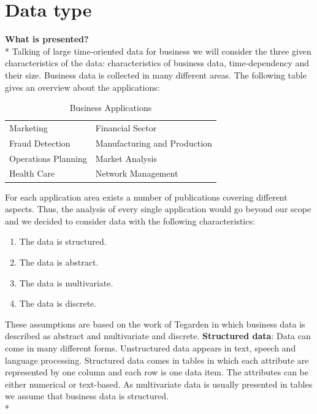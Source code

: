 \section{Data type} \label{data}

\textbf{What is presented?}\\*
Talking of large time-oriented data for business we will consider the three given characteristics of the data: characteristics of business data, time-dependency and their size. Business data is collected in many different areas. The following table gives an overview about the applications: 

\begin{table}[H]
	\centering
	\caption[Business Applications]{Business Applications\cite{Brachman1996,Tegarden1999}}
	\label{businessapplications}
	\begin{tabu}{ll}
	\toprule
	Marketing & Financial Sector \\
	Fraud Detection & Manufacturing and Production \\
	Operations Planning & Market Analysis \\
	Health Care & Network Management\\
	\bottomrule
	\end{tabu}
\end{table}
For each application area exists a number of publications covering different aspects. Thus, the analysis of every single application would go beyond our scope and we decided to consider data with the following characteristics: 
\begin{enumerate}
    \item The data is structured. 
    \item The data is abstract.
    \item The data is multivariate.
    \item The data is discrete.
\end{enumerate}
These assumptions are based on the work of Tegarden in which business data is described as abstract and multivariate and discrete\cite{Tegarden1999}.
\textbf{Structured data}: Data can come in many different forms. Unstructured data appears in text, speech and language processing\cite{Borgo2013}. Structured data comes in tables in which each attribute are represented by one column and each row is one data item. The attributes can be either numerical or text-based. As multivariate data is usually presented in tables\cite{Borgo2013} we assume that business data is structured.\\*
